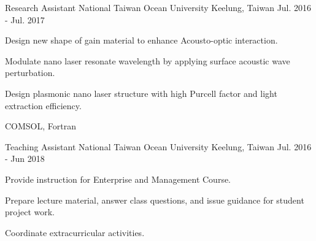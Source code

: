 \begin{cventries}
  \cventry
    {Research Assistant} %
    {National Taiwan Ocean University} %
    {Keelung, Taiwan} %
    {Jul. 2016 - Jul. 2017} %
    {
      \begin{cvitems} %
        \item {Design new shape of gain material to enhance Acousto-optic interaction.}
        \item {Modulate nano laser resonate wavelength by applying surface acoustic wave perturbation.}
        \item {Design plasmonic nano laser structure with high Purcell factor and light extraction efficiency.}
        \item {COMSOL, Fortran}
      \end{cvitems}
    }

  \cventry
    {Teaching Assistant} %
    {National Taiwan Ocean University} %
    {Keelung, Taiwan} %
    {Jul. 2016 - Jun 2018} %
    {
      \begin{cvitems} %
        \item {Provide instruction for Enterprise and Management Course.}
        \item {Prepare lecture material, answer class questions, and issue guidance for student project work.}
        \item {Coordinate extracurricular activities.}
      \end{cvitems}
    }

\end{cventries}
